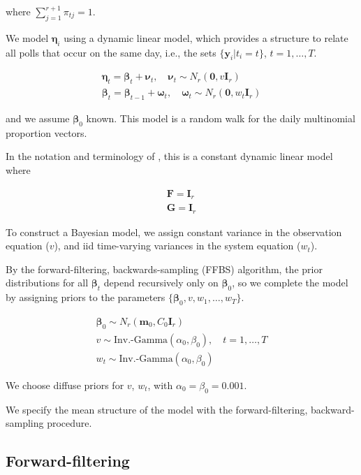 \documentclass{article}
\begin{document}
where $\sum_{j=1}^{r+1}\pi_{tj}=1$.

We model $\bm\eta_{i}$ using a dynamic linear model, which provides a
structure to relate all polls that occur on the same day, i.e., the
sets $\{\mathbf{y}_{i} | t_{i}=t \}$, $t=1,\dots,T$.

\begin{gather}
  \bm\eta_{t} = \bm\beta_{t} + \bm\nu_{t},\quad \bm\nu_{t}\sim N_{r}(\bm 0,
  v\mathbf{I}_{r}) \\
  \bm\beta_{t} = \bm\beta_{t-1} + \bm\omega_{t}, \quad
  \bm\omega_{t}\sim N_{r}(\bm 0, w_{t}\mathbf{I}_{r})
\end{gather}

and we assume
$\bm\beta_{0}$ known. This model is a random walk for the daily
multinomial proportion vectors.

In the notation and terminology of \cite{west1997}, this is a constant
dynamic linear model where

\begin{gather}
  \mathbf{F} = \mathbf{I}_{r} \\
  \mathbf{G} = \mathbf{I}_{r}
\end{gather}

To construct a Bayesian model, we assign
constant variance in the observation equation ($v$), and 
iid time-varying variances in the system equation
($w_{t}$).

By the forward-filtering, backwards-sampling (FFBS) algorithm, the
prior distributions for all $\bm\beta_{t}$ depend recursively only on
$\bm\beta_{0}$, so we complete the model by assigning priors to the
parameters $\{ \bm\beta_{0}, v, w_{1},\dots, w_{T}\}$.

\begin{gather}
  \bm\beta_{0}\sim N_{r}(\mathbf{m}_{0}, C_{0}\mathbf{I}_{r}) \\
  v\sim \text{Inv.-Gamma}(\alpha_{0},\beta_{0}), \quad t=1,\dots,T \\
  w_{t} \sim \text{Inv.-Gamma}(\alpha_{0},\beta_{0})
\end{gather}

We choose diffuse priors for $v$, $w_{t}$, with
$\alpha_{0}=\beta_{0}=0.001$.

We specify the mean structure of the model with the forward-filtering,
backward-sampling procedure.

\subsection{Forward-filtering}
\end{document}
